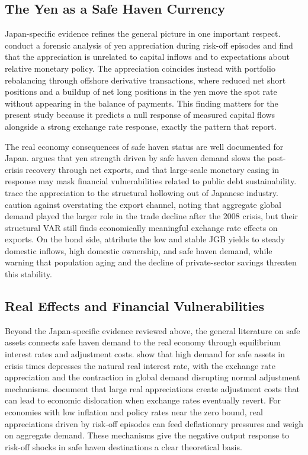 \subsection{The Yen as a Safe Haven Currency}

Japan-specific evidence refines the general picture in one important respect. \textcite{botman_carvalho_lam_2013} conduct a forensic analysis of yen appreciation during risk-off episodes and find that the appreciation is unrelated to capital inflows and to expectations about relative monetary policy. The appreciation coincides instead with portfolio rebalancing through offshore derivative transactions, where reduced net short positions and a buildup of net long positions in the yen move the spot rate without appearing in the balance of payments. This finding matters for the present study because it predicts a null response of measured capital flows alongside a strong exchange rate response, exactly the pattern that \textcite{beirne_sugandi_2023} report.

The real economy consequences of safe haven status are well documented for Japan. \textcite{masujima_2017} argues that yen strength driven by safe haven demand slows the post-crisis recovery through net exports, and that large-scale monetary easing in response may mask financial vulnerabilities related to public debt sustainability. \textcite{belke_volz_2020} trace the appreciation to the structural hollowing out of Japanese industry. \textcite{iwaisako_nakata_2017} caution against overstating the export channel, noting that aggregate global demand played the larger role in the trade decline after the 2008 crisis, but their structural VAR still finds economically meaningful exchange rate effects on exports. On the bond side, \textcite{lam_tokuoka_2013} attribute the low and stable JGB yields to steady domestic inflows, high domestic ownership, and safe haven demand, while warning that population aging and the decline of private-sector savings threaten this stability.

\subsection{Real Effects and Financial Vulnerabilities}

Beyond the Japan-specific evidence reviewed above, the general literature on safe assets connects safe haven demand to the real economy through equilibrium interest rates and adjustment costs. \textcite{habib_stracca_venditti_2020} show that high demand for safe assets in crisis times depresses the natural real interest rate, with the exchange rate appreciation and the contraction in global demand disrupting normal adjustment mechanisms. \textcite{bussiere_lopez_tille_2013} document that large real appreciations create adjustment costs that can lead to economic dislocation when exchange rates eventually revert. For economies with low inflation and policy rates near the zero bound, real appreciations driven by risk-off episodes can feed deflationary pressures and weigh on aggregate demand. These mechanisms give the negative output response to risk-off shocks in safe haven destinations a clear theoretical basis.

